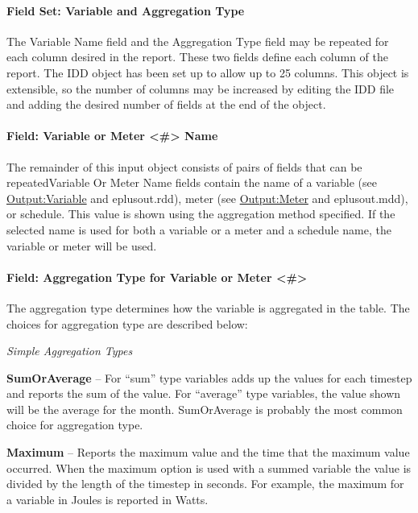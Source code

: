 \paragraph{Field Set: Variable and Aggregation Type}\label{field-set-variable-and-aggregation-type}

The Variable Name field and the Aggregation Type field may be repeated for each column desired in the report. These two fields define each column of the report. The IDD object has been set up to allow up to 25 columns. This object is extensible, so the number of columns may be increased by editing the IDD file and adding the desired number of fields at the end of the object.

\paragraph{Field: Variable or Meter \textless{}\#\textgreater{} Name}\label{field-variable-or-meter-name}

The remainder of this input object consists of pairs of fields that can be repeatedVariable Or Meter Name fields contain the name of a variable (see \hyperref[outputvariable]{Output:Variable} and eplusout.rdd), meter (see \hyperref[outputmeter-and-outputmetermeterfileonly]{Output:Meter} and eplusout.mdd), or schedule. This value is shown using the aggregation method specified. If the selected name is used for both a variable or a meter and a schedule name, the variable or meter will be used.

\paragraph{Field: Aggregation Type for Variable or Meter \textless{}\#\textgreater{}}\label{field-aggregation-type-for-variable-or-meter}

The aggregation type determines how the variable is aggregated in the table. The choices for aggregation type are described below:

\emph{Simple Aggregation Types}

\textbf{SumOrAverage} -- For ``sum'' type variables adds up the values for each timestep and reports the sum of the value. For ``average'' type variables, the value shown will be the average for the month. SumOrAverage is probably the most common choice for aggregation type.

\textbf{Maximum} -- Reports the maximum value and the time that the maximum value occurred. When the maximum option is used with a summed variable the value is divided by the length of the timestep in seconds. For example, the maximum for a variable in Joules is reported in Watts.

